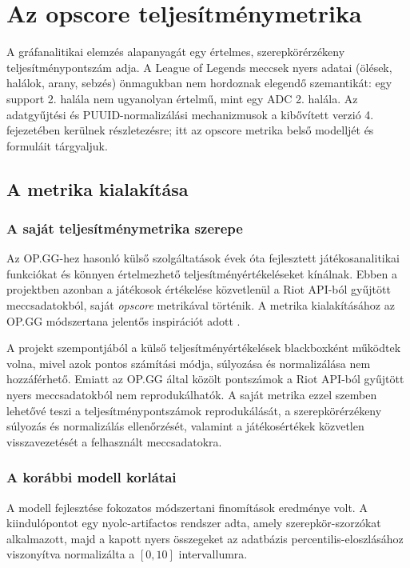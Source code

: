 \chapter{Az opscore teljesítménymetrika}

\noindent A gráfanalitikai elemzés alapanyagát egy értelmes, szerepkörérzékeny teljesítménypontszám adja. A League of Legends meccsek nyers adatai (ölések, halálok, arany, sebzés) önmagukban nem hordoznak elegendő szemantikát: egy support 2. halála nem ugyanolyan értelmű, mint egy ADC 2. halála. Az adatgyűjtési és PUUID-normalizálási mechanizmusok a kibővített verzió 4. fejezetében kerülnek részletezésre; itt az opscore metrika belső modelljét és formuláit tárgyaljuk.

\section{A metrika kialakítása}

\subsection{A saját teljesítménymetrika szerepe}

Az OP.GG-hez hasonló külső szolgáltatások évek óta fejlesztett játékosanalitikai funkciókat és könnyen értelmezhető teljesítményértékeléseket kínálnak. Ebben a projektben azonban a játékosok értékelése közvetlenül a Riot API-ból gyűjtött meccsadatokból, saját \textit{opscore} metrikával történik. A metrika kialakításához az OP.GG módszertana jelentős inspirációt adott \cite{opgg-features}.

A projekt szempontjából a külső teljesítményértékelések blackboxként működtek volna, mivel azok pontos számítási módja, súlyozása és normalizálása nem hozzáférhető. Emiatt az OP.GG által közölt pontszámok a Riot API-ból gyűjtött nyers meccsadatokból nem reprodukálhatók. A saját metrika ezzel szemben lehetővé teszi a teljesítménypontszámok reprodukálását, a szerepkörérzékeny súlyozás és normalizálás ellenőrzését, valamint a játékosértékek közvetlen visszavezetését a felhasznált meccsadatokra.
\subsection{A korábbi modell korlátai}

A modell fejlesztése fokozatos módszertani finomítások eredménye volt. A kiindulópontot egy nyolc-artifactos rendszer adta, amely szerepkör-szorzókat alkalmazott, majd a kapott nyers összegeket az adatbázis percentilis-eloszlásához viszonyítva normalizálta a $[0,10]$ intervallumra.


